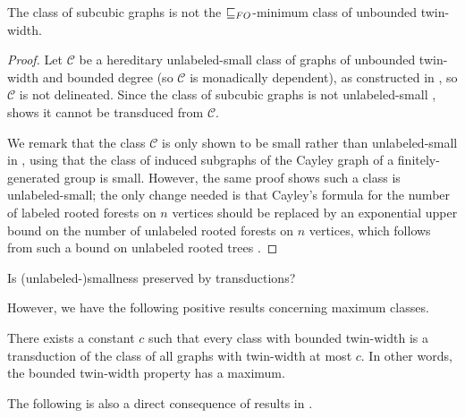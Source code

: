 \documentclass{lmcs}
\newcommand{\Cc}{\mathscr{C}}
\renewcommand{\FO}{{\rm FO}}
\theoremstyle{definition}
\begin{document}
\begin{cor}
The class of subcubic graphs is not the $\sqsubseteq_\FO$-minimum class of unbounded twin-width.
\end{cor}
\begin{proof}
		Let $\Cc$ be a hereditary unlabeled-small class of graphs of unbounded twin-width and bounded degree (so $\Cc$ is monadically dependent), as constructed in \cite{bonnet2022twin7}, so $\Cc$ is not delineated. Since the class of subcubic graphs is not unlabeled-small \cite[Formula 6.6]{noyHandbook},  shows it cannot be transduced from $\Cc$.
		
		We remark that the class $\Cc$ is only shown to be small rather than unlabeled-small in \cite{bonnet2022twin7}, using \cite[Lemma 41]{bonnet2020twin2} that the class of induced subgraphs of the Cayley graph of a finitely-generated group is small. However, the same proof shows such a class is unlabeled-small; the only change needed is that Cayley's formula for the number of labeled rooted forests on $n$ vertices should be replaced by an exponential upper bound on the number of unlabeled rooted forests on $n$ vertices, which follows from such a bound on unlabeled rooted trees \cite[Theorem 4.4.6]{drmotaHandbook}.
\end{proof}

\begin{prob}
	Is (unlabeled-)smallness preserved by transductions?
	\end{prob}
	
	
	However, we have the following positive results concerning maximum classes.
	
\begin{thm}
	\label{thm:max_TWW}
	There exists a constant $c$ such that every class with bounded twin-width is a transduction of the class of all graphs with twin-width at most $c$. In other words, the bounded twin-width property has a maximum.
\end{thm}
	
	The following is also a direct consequence of results in \cite{TWW-factor}.
	
\end{document}
